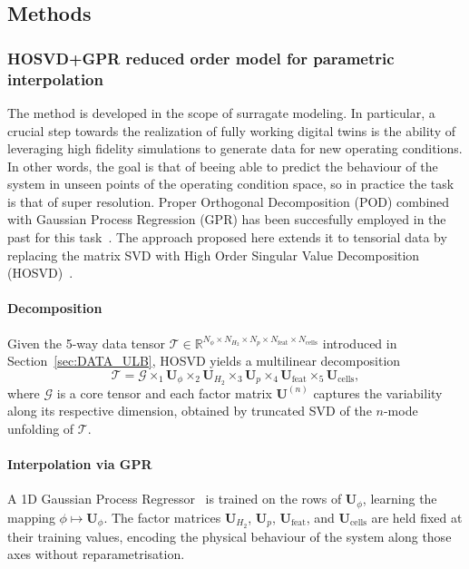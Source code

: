 \subsection{Methods}
\label{sec:methods_ulb}

\subsubsection{HOSVD+GPR reduced order model for parametric interpolation}
\label{sec:method_hosvd_gpr}

The method is developed in the scope of surragate modeling. In particular, a crucial step towards the realization of fully working digital twins is the ability of leveraging high fidelity simulations to generate data for new operating conditions. In other words, the goal is that of beeing able to predict the behaviour of the system in unseen points of the operating condition space, so in practice the task is that of super resolution. Proper Orthogonal Decomposition (POD) combined with Gaussian Process Regression (GPR) has been succesfully employed in the past for this task~\cite{aversano2021digital}. The approach proposed here extends it to tensorial data by replacing the matrix SVD with High Order Singular Value Decomposition (HOSVD)~\cite{de2000multilinear}.

\paragraph*{Decomposition}

Given the 5-way data tensor $\mathcal{T} \in \mathbb{R}^{N_\phi \times N_{H_2} \times N_p \times N_{\mathrm{feat}} \times N_{\mathrm{cells}}}$ introduced in Section~\ref{sec:DATA_ULB}, HOSVD yields a multilinear decomposition
\[
  \mathcal{T} = \mathcal{G}
    \times_1 \mathbf{U}_\phi
    \times_2 \mathbf{U}_{H_2}
    \times_3 \mathbf{U}_p
    \times_4 \mathbf{U}_{\mathrm{feat}}
    \times_5 \mathbf{U}_{\mathrm{cells}},
\]
where $\mathcal{G}$ is a core tensor and each factor matrix $\mathbf{U}^{(n)}$ captures the variability along its respective dimension, obtained by truncated SVD of the $n$-mode unfolding of $\mathcal{T}$.

\paragraph*{Interpolation via GPR}

A 1D Gaussian Process Regressor~\cite{williams1995gaussian} is trained on the rows of $\mathbf{U}_\phi$, learning the mapping $\phi \mapsto \mathbf{U}_\phi$. The factor matrices $\mathbf{U}_{H_2}$, $\mathbf{U}_p$, $\mathbf{U}_{\mathrm{feat}}$, and $\mathbf{U}_{\mathrm{cells}}$ are held fixed at their training values, encoding the physical behaviour of the system along those axes without reparametrisation.

